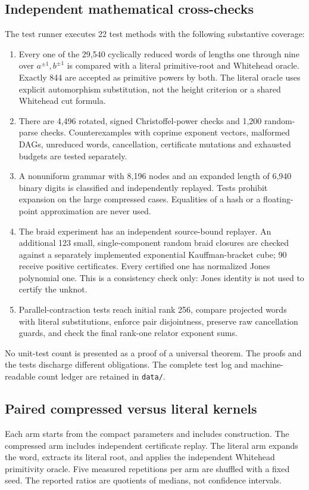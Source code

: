 \documentclass[11pt,letterpaper]{article}
\theoremstyle{definition}
\begin{document}
\subsection{Independent mathematical cross-checks}
The test runner executes 22 test methods with the following substantive
coverage:
\begin{enumerate}[leftmargin=*,itemsep=2pt]
\item Every one of the 29,540 cyclically reduced words of lengths one through
nine over $a^{\pm1},b^{\pm1}$ is compared with a literal primitive-root and
Whitehead oracle. Exactly 844 are accepted as primitive powers by both.
The literal oracle uses explicit automorphism substitution, not the height
criterion or a shared Whitehead cut formula.
\item There are 4,496 rotated, signed Christoffel-power checks and 1,200
random-parse checks. Counterexamples with coprime exponent vectors, malformed
DAGs, unreduced words, cancellation, certificate mutations and exhausted
budgets are tested separately.
\item A nonuniform grammar with 8,196 nodes and an expanded length of 6,940
binary digits is classified and independently replayed. Tests prohibit
expansion on the large compressed cases. Equalities of a hash or a
floating-point approximation are never used.
\item The braid experiment has an independent source-bound replayer. An
additional 123 small, single-component random braid closures are checked
against a separately implemented exponential Kauffman-bracket cube; 90
receive positive certificates. Every certified one has normalized Jones
polynomial one. This is a consistency check only: Jones identity is not
used to certify the unknot.
\item Parallel-contraction tests reach initial rank 256, compare projected
words with literal substitutions, enforce pair disjointness, preserve raw
cancellation guards, and check the final rank-one relator exponent sums.
\end{enumerate}
No unit-test count is presented as a proof of a universal theorem. The
proofs and the tests discharge different obligations. The complete test log
and machine-readable count ledger are retained in \texttt{data/}.

\subsection{Paired compressed versus literal kernels}
Each arm starts from the compact parameters and includes construction. The
compressed arm includes independent certificate replay. The literal arm
expands the word, extracts its literal root, and applies the independent
Whitehead primitivity oracle. Five measured repetitions per arm are shuffled
with a fixed seed. The reported ratios are quotients of medians, not
confidence intervals.
\end{document}
